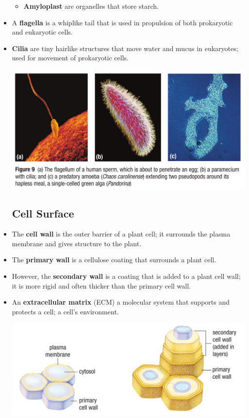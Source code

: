 \documentclass[letterpaper]{article}
\numberwithin{equation}{section}
\theoremstyle{classic}
\begin{document}
\begin{itemize}
\begin{itemize}
        \item \textbf{Amyloplast} are organelles that store starch.
    \end{itemize}
    \item A \textbf{flagella} is a whiplike tail that is used in propulsion of both prokaryotic and eukaryotic cells.
    \item \textbf{Cilia} are tiny hairlike structures that move water and mucus in eukaryotes; used for movement of prokaryotic cells.
    \begin{center}\includegraphics[width=0.6\linewidth]{A12.PNG}\end{center}
    \subsection{Cell Surface}
    \item The \textbf{cell wall} is the outer barrier of a plant cell; it surrounds the plasma membrane and gives structure to the plant.
    \item The \textbf{primary wall} is a cellulose coating that surrounds a plant cell.
    \item However, the \textbf{secondary wall} is a coating that is added to a plant cell wall; it is more rigid and often thicker than the primary cell wall.
    \item An \textbf{extracellular matrix} (ECM) a molecular system that supports and protects a cell; a cell’s environment.
    \begin{center}\includegraphics[width=0.6\linewidth]{A13.PNG}\end{center}
\end{itemize}

\newpage
\end{document}
